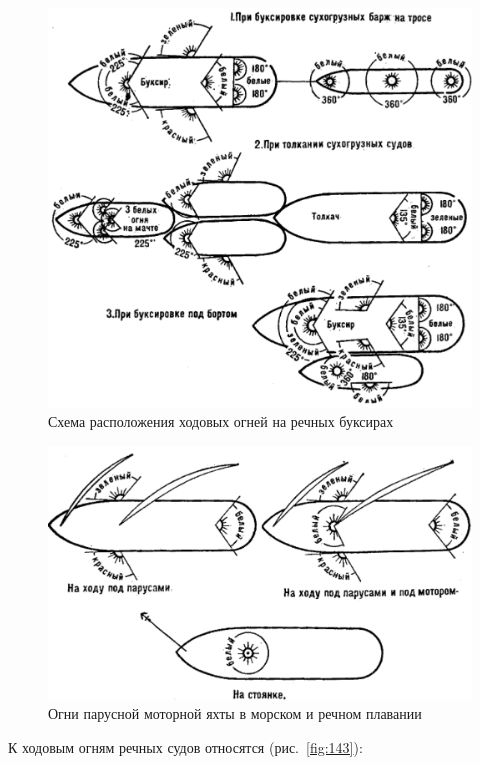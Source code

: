 \documentclass[a4paper, 12pt, twoside, final]{scrbook}
\begin{document}
\begin{figure}[htbp]
   \centering
   \includegraphics{144_Ogni} %
   \caption{Схема расположения ходовых огней на речных буксирах}
   \label{fig:144}
\end{figure}

\begin{figure}[htbp]
   \centering
   \includegraphics{145_Ogni} %
   \caption{Огни парусной моторной яхты в морском и речном плавании}
   \label{fig:145}
\end{figure}

К ходовым огням речных судов относятся (рис.~\ref{fig:143}):
\end{document}
